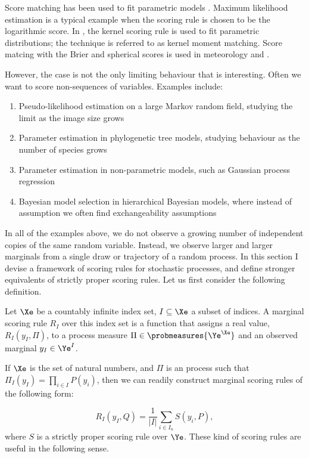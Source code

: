 Score matching has been used to fit parametric models . Maximum likelihood estimation is a typical example when the scoring rule is chosen to be the logarithmic score. In \citep{kernelmomentmatching}, the kernel scoring rule is used to fit parametric distributions; the technique is referred to as kernel moment matching. Score matcing with the Brier and spherical scores is used in meteorology and .

However, the \iid case is not the only limiting behaviour that is interesting. Often we want to score non-\iid sequences of variables. Examples include:
\begin{enumerate}
	\item Pseudo-likelihood estimation on a large Markov random field, studying the limit as the image size grows
	\item Parameter estimation in phylogenetic tree models, studying behaviour as the number of species grows
	\item Parameter estimation in non-parametric models, such as Gaussian process regression
	\item Bayesian model selection in hierarchical Bayesian models, where instead of \iid assumption we often find exchangeability assumptions
\end{enumerate}

In all of the examples above, we do not observe a growing number of independent copies of the same random variable. Instead, we observe larger and larger marginals from a single draw or trajectory of a random process. In this section I devise a framework of scoring rules for stochastic processes, and define stronger equivalents of strictly proper scoring rules. Let us first consider the following definition.

\begin{definition}
Let $\Xe$ be a countably infinite index set, $I\subseteq\Xe$ a subset of indices. A marginal scoring rule $R_I$ over this index set is a function that assigns a real value, $R_{I}(y_{I},\Pi)$,  to a process measure $\Pi\in\probmeasures{\Ye^{\Xe}}$ and an observed marginal $y_{I}\in\Ye^{I}$.
\end{definition}

If $\Xe$ is the set of natural numbers, and $\Pi$ is an \iid process such that $\Pi_{I}(y_{I}) = \prod_{i\in I} P(y_i)$, then we can readily construct marginal scoring rules of the following form:

\begin{equation}
R_{I}(y_{I},Q) = \frac{1}{\vert I \vert} \sum_{i\in I_n} S(y_i,P)\label{eqn:decompose},
\end{equation}
where $S$ is a strictly proper scoring rule over $\Ye$. These kind of scoring rules are useful in the following sense.

